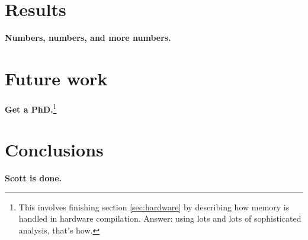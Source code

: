 \documentclass[12pt,titlepage,twoside]{article}
\let\oldsection\section
\renewcommand{\section}{\setcounter{figure}{0}\setcounter{table}{0}\oldsection}
\begin{document}
\section{Results}
\textbf{Numbers, numbers, and more numbers.}

\section{Future work}
\textbf{Get a PhD.}\footnote{This involves finishing section
\ref{sec:hardware} by describing how memory is handled in hardware
compilation.  Answer: using lots and lots of sophisticated analysis,
that's how.}

\section{Conclusions}
\textbf{Scott is done.}

\newpage

\newpage
\appendix
\end{document}
